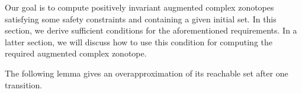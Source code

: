 Our goal is to compute positively invariant augmented complex
zonotopes satisfying some safety constraints and containing a given
initial set.  In this section, we derive sufficient conditions for the
aforementioned requirements.  In a latter section, we will discuss how
to use this condition for computing the required augmented complex
zonotope.

The following lemma gives an overapproximation of its reachable set
after one transition.

